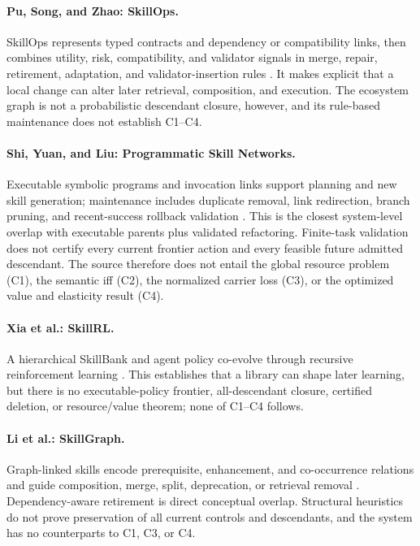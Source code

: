 \paragraph{Pu, Song, and Zhao: SkillOps.}
SkillOps represents typed contracts and dependency or compatibility links,
then combines utility, risk, compatibility, and validator signals in merge,
repair, retirement, adaptation, and validator-insertion rules
\cite{PuSongZhao2026SkillOps}.  It makes explicit that a local change can alter
later retrieval, composition, and execution.  The ecosystem graph is not a
probabilistic descendant closure, however, and its rule-based maintenance
does not establish C1--C4.

\paragraph{Shi, Yuan, and Liu: Programmatic Skill Networks.}
Executable symbolic programs and invocation links support planning and new
skill generation; maintenance includes duplicate removal, link redirection,
branch pruning, and recent-success rollback validation
\cite{ShiYuanLiu2026PSN}.  This is the closest system-level overlap with
executable parents plus validated refactoring.  Finite-task validation does
not certify every current frontier action and every feasible future admitted
descendant.  The source therefore does not entail the global resource problem
(C1), the semantic iff (C2), the normalized carrier loss (C3), or the
optimized value and elasticity result (C4).

\paragraph{Xia et al.: SkillRL.}
A hierarchical SkillBank and agent policy co-evolve through recursive
reinforcement learning \cite{XiaEtAl2026SkillRL}.  This establishes that a
library can shape later learning, but there is no executable-policy frontier,
all-descendant closure, certified deletion, or resource/value theorem; none
of C1--C4 follows.

\paragraph{Li et al.: SkillGraph.}
Graph-linked skills encode prerequisite, enhancement, and co-occurrence
relations and guide composition, merge, split, deprecation, or retrieval
removal \cite{LiEtAl2026SkillGraph}.  Dependency-aware retirement is direct
conceptual overlap.  Structural heuristics do not prove preservation of all
current controls and descendants, and the system has no counterparts to C1,
C3, or C4.

